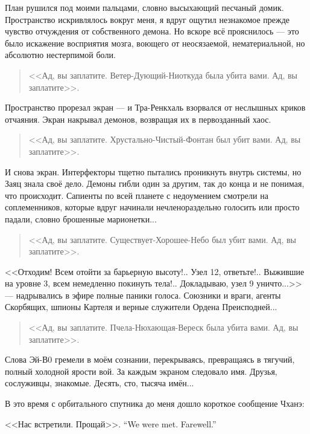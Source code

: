 План рушился под моими пальцами, словно высыхающий песчаный домик.
Пространство искривлялось вокруг меня, я вдруг ощутил незнакомое прежде чувство отчуждения от собственного демона.
Но вскоре всё прояснилось --- это было искажение восприятия мозга, воющего от неосязаемой, нематериальной, но абсолютно нестерпимой боли.

\begin{quote}
<<Ад, вы заплатите.
Ветер-Дующий-Ниоткуда была убита вами.
Ад, вы заплатите>>.
\end{quote}

Пространство прорезал экран --- и Тра-Ренкхаль взорвался от неслышных криков отчаяния.
Экран накрывал демонов, возвращая их в первозданный хаос.

\begin{quote}
<<Ад, вы заплатите.
Хрустально-Чистый-Фонтан был убит вами.
Ад, вы заплатите>>.
\end{quote}

И снова экран.
Интерфекторы тщетно пытались проникнуть внутрь системы, но Заяц знала своё дело.
Демоны гибли один за другим, так до конца и не понимая, что происходит.
Сапиенты по всей планете с недоумением смотрели на соплеменников, которые вдруг начинали нечленораздельно голосить или просто падали, словно брошенные марионетки...

\begin{quote}
<<Ад, вы заплатите.
Существует-Хорошее-Небо был убит вами.
Ад, вы заплатите>>.
\end{quote}

<<Отходим!
Всем отойти за барьерную высоту!..
Узел 12, ответьте!..
Выжившие на уровне 3, всем немедленно покинуть тела!..
Докладываю, узел 9 уничто...>> --- надрывались в эфире полные паники голоса.
Союзники и враги, агенты Скорбящих, шпионы Картеля и верные служители Ордена Преисподней...

\begin{quote}
<<Ад, вы заплатите.
Пчела-Нюхающая-Вереск была убита вами.
Ад, вы заплатите>>.
\end{quote}

Слова Эй-В0 гремели в моём сознании, перекрываясь, превращаясь в тягучий, полный холодной ярости вой.
За каждым экраном следовало имя.
Друзья, сослуживцы, знакомые.
Десять, сто, тысяча имён...

В это время с орбитального спутника до меня дошло короткое сообщение Чханэ:

{<<Нас встретили. Прощай>>.}
{``We were met. Farewell.''}


